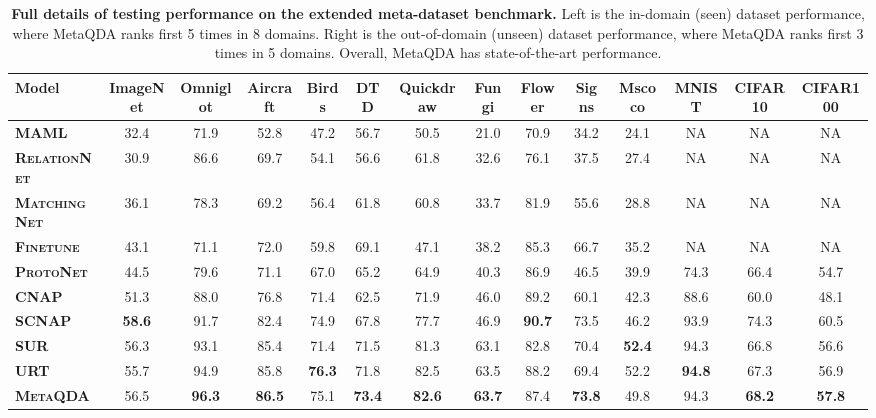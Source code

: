 \documentclass[10pt,twocolumn,letterpaper]{article}
\begin{document}
\setlength{\tabcolsep}{4.6pt}
\begin{table*}[h]
\centering
\footnotesize
\begin{tabular}{@{} l|cccccccc|ccccc @{}}
\toprule

{\bf Model} & ImageNet & Omniglot & Aircraft & Birds & DTD & Quickdraw & Fungi & Flower & Signs & Mscoco & MNIST & CIFAR10 & CIFAR100 \\
\midrule 

\textbf{\textsc{MAML}} \cite{finn2017model} & 32.4 & 71.9 & 52.8 & 47.2 & 56.7 & 50.5 & 21.0 & 70.9 & 34.2 & 24.1 & NA & NA & NA\\
\textbf{\textsc{RelationNet}} \cite{sung2018learning} & 30.9 & 86.6 & 69.7 & 54.1 & 56.6 & 61.8 & 32.6 & 76.1 & 37.5 & 27.4 & NA & NA & NA  \\
\textbf{\textsc{MatchingNet}} \cite{vinyals2016matching} & 36.1 & 78.3 & 69.2 & 56.4 & 61.8 & 60.8 & 33.7 & 81.9 & 55.6 & 28.8 & NA & NA & NA  \\
\textbf{\textsc{Finetune}} \cite{yosinski2014howTransferable} & 43.1 & 71.1 & 72.0 & 59.8 & 69.1 & 47.1 & 38.2 & 85.3 & 66.7 & 35.2 & NA & NA & NA  \\
\textbf{\textsc{ProtoNet}} \cite{snell2017prototypical} & 44.5 & 79.6 & 71.1 & 67.0 & 65.2 & 64.9 & 40.3 & 86.9 & 46.5 & 39.9 & 74.3 & 66.4 & 54.7 \\
\textbf{\textsc{CNAP}} \cite{requeima2019cnaps}& 51.3 & 88.0 & 76.8 & 71.4 & 62.5 & 71.9 & 46.0 & 89.2 & 60.1 & 42.3 & 88.6 & 60.0 & 48.1 \\
\textbf{\textsc{SCNAP}} \cite{bateni2020improved} & \bf{58.6} & 91.7 & 82.4 & 74.9 & 67.8 & 77.7 & 46.9 & \bf{90.7} & 73.5 & 46.2 & 93.9 & 74.3 & 60.5 \\
\textbf{\textsc{SUR}} \cite{dvornik2020selecting}& 56.3 & 93.1 & 85.4 & 71.4 & 71.5 & 81.3 & 63.1 & 82.8 & 70.4 & \bf{52.4} & 94.3 & 66.8 & 56.6 \\
\textbf{\textsc{URT}} \cite{liu2020universal} & 55.7 & 94.9 & 85.8 & \bf{76.3} & 71.8 & 82.5 & 63.5 & 88.2 & 69.4 & 52.2 & \bf{94.8} & 67.3 & 56.9 \\
\midrule

\textbf{\textsc{MetaQDA}} & 56.5 & \bf{96.3} & \bf{86.5} & 75.1 & \bf{73.4} & \bf{82.6} & \bf{63.7} & 87.4 & \bf{73.8} & 49.8 & 94.3 & \bf{68.2} & \bf{57.8} \\


\bottomrule
\end{tabular}\caption{\small \small
\textbf{Full details of testing performance on the extended meta-dataset benchmark.} Left is the in-domain (seen) dataset performance, where MetaQDA ranks first 5 times in 8 domains. Right is the out-of-domain (unseen) dataset performance, where MetaQDA ranks first 3 times in 5 domains. Overall, MetaQDA has state-of-the-art performance.
}
\vskip 0.5cm
\label{tab:fullmetadataset}
\end{table*}
\end{document}
